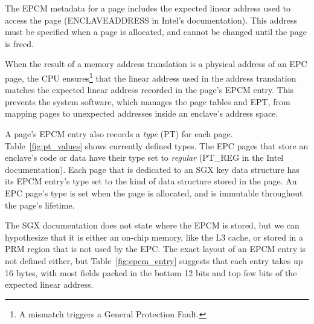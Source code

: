
The EPCM metadata for a page includes the expected linear address used to
access the page (ENCLAVEADDRESS in Intel's documentation). This address must be
specified when a page is allocated, and cannot be changed until the page is
freed.

When the result of a memory address translation is a physical address of an EPC
page, the CPU ensures\footnote{A mismatch triggers a General Protection Fault.}
that the linear address used in the address translation matches the expected
linear address recorded in the page's EPCM entry. This prevents the system
software, which manages the page tables and EPT, from mapping pages to
unexpected addresses inside an enclave's address space.

A page's EPCM entry also records a \textit{type} (PT) for each page.
Table~\ref{fig:pt_values} shows currently defined types. The EPC pages that
store an enclave's code or data have their type set to \textit{regular}
(PT\_REG in the Intel documentation). Each page that is dedicated to an SGX key
data structure has its EPCM entry's type set to the kind of data structure
stored in the page.  An EPC page's type is set when the page is allocated, and
is immutable throughout the page's lifetime.

\begin{table}[hbt]
  \caption{Values of the PT (page type) field in an EPCM entry.}
  \label{fig:pt_values}
\end{table}


The SGX documentation does not state where the EPCM is stored, but we can
hypothesize that it is either an on-chip memory, like the L3 cache, or stored
in a PRM region that is not used by the EPC. The exact layout of an EPCM entry
is not defined either, but Table~\ref{fig:epcm_entry} suggests that each entry
takes up 16 bytes, with most fields packed in the bottom 12 bits and top few
bits of the expected linear address.

